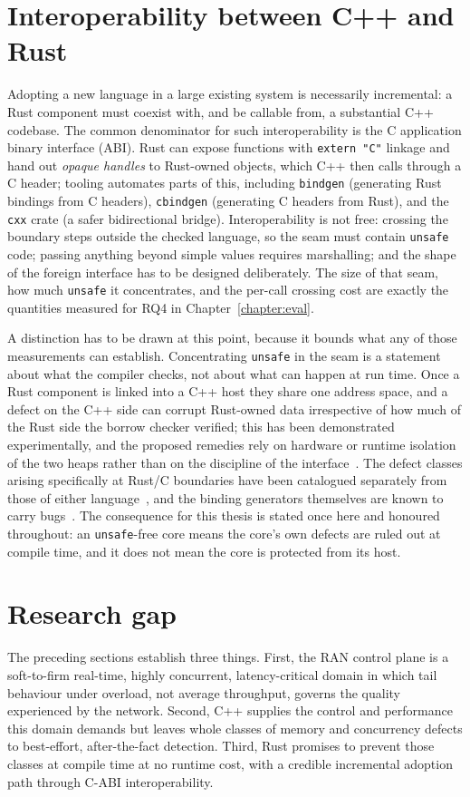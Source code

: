 \documentclass[english,twoside,openright,a4paper,censored,csm,software-track-2020]{HYthesisML}
\begin{document}
\section{Interoperability between C++ and Rust}
Adopting a new language in a large existing system is necessarily incremental: a Rust
component must coexist with, and be callable from, a substantial C++ codebase. The common
denominator for such interoperability is the C application binary interface (ABI). Rust can
expose functions with \texttt{extern "C"} linkage and hand out \emph{opaque handles} to
Rust-owned objects, which C++ then calls through a C header; tooling automates parts of this,
including \texttt{bindgen} (generating Rust bindings from C headers), \texttt{cbindgen}
(generating C headers from Rust), and the \texttt{cxx} crate (a safer bidirectional bridge).
Interoperability is not free: crossing the boundary steps outside the checked language, so the
seam must contain \texttt{unsafe} code; passing anything beyond simple values requires
marshalling; and the shape of the foreign interface has to be designed deliberately. The size
of that seam, how much \texttt{unsafe} it concentrates, and the per-call crossing cost are
exactly the quantities measured for RQ4 in Chapter~\ref{chapter:eval}.

A distinction has to be drawn at this point, because it bounds what any of those measurements
can establish. Concentrating \texttt{unsafe} in the seam is a statement about what the compiler
checks, not about what can happen at run time. Once a Rust component is linked into a C++ host
they share one address space, and a defect on the C++ side can corrupt Rust-owned data
irrespective of how much of the Rust side the borrow checker verified; this has been
demonstrated experimentally, and the proposed remedies rely on hardware or runtime isolation of
the two heaps rather than on the discipline of the
interface~\cite{rivera2021galeed,kirth2022pkrusafe}. The defect classes arising specifically at
Rust/C boundaries have been catalogued separately from those of either
language~\cite{li2022crosslang}, and the binding generators themselves are known to carry
bugs~\cite{cai2026interop}. The consequence for this thesis is stated once here and honoured
throughout: an \texttt{unsafe}-free core means the core's own defects are ruled out at compile
time, and it does not mean the core is protected from its host.

\section{Research gap}\label{sec:gap}
The preceding sections establish three things. First, the RAN control plane is a
soft-to-firm real-time, highly concurrent, latency-critical domain in which tail behaviour
under overload, not average throughput, governs the quality experienced by the network.
Second, C++ supplies the control and performance this domain demands but leaves whole classes
of memory and concurrency defects to best-effort, after-the-fact detection. Third, Rust
promises to prevent those classes at compile time at no runtime cost, with a credible
incremental adoption path through C-ABI interoperability.
\end{document}

